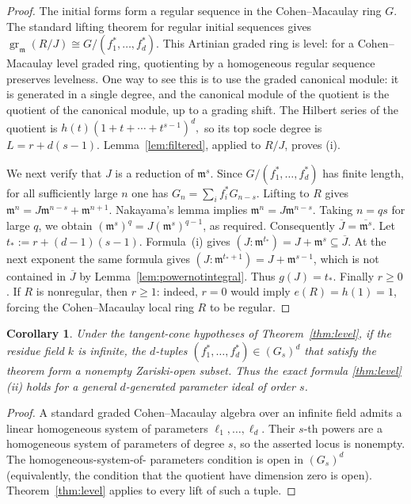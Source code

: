 \documentclass[11pt,a4paper]{amsart}
\numberwithin{equation}{section}
\newtheorem{corollary}[theorem]{Corollary}
\newcommand{\m}{\mathfrak m}
\newcommand{\ol}[1]{\overline{#1}}
\newcommand{\gr}{\operatorname{gr}}
\begin{document}
 \begin{proof}
 	The initial forms form a regular sequence in the
 	Cohen--Macaulay ring $G$.  The standard lifting theorem for
 	regular initial sequences gives
 	$ \gr_\m(R/J)\cong G/(f_1^*,\ldots,f_d^*). $
 	This Artinian graded ring is level: for a Cohen--Macaulay
 	level graded ring, quotienting by a homogeneous regular
 	sequence preserves levelness.  One way to see this is to
 	use the graded canonical module: it is generated in a single
 	degree, and the canonical module of the quotient is the
 	quotient of the canonical module, up to a grading shift.
 	The Hilbert series of the quotient is
 	$ 	h(t)(1+t+\cdots+t^{s-1})^d, $
 	so its top socle degree is $L=r+d(s-1)$.
 	Lemma~\ref{lem:filtered}, applied to $R/J$, proves
 	(i).
 	
 	We next verify that $J$ is a reduction of $\m^s$.
 	Since $G/(f_1^*,\ldots,f_d^*)$ has finite length,
 	for all sufficiently large $n$ one has
 	$G_n=\sum_i f_i^*G_{n-s}$.  Lifting to $R$ gives
 	$ \m^n=J\m^{n-s}+\m^{n+1}. $
 	Nakayama's lemma implies $\m^n=J\m^{n-s}$.
 	Taking $n=qs$ for large $q$, we obtain
 	$(\m^s)^q=J(\m^s)^{q-1}$, as required.
 	Consequently $\ol J=\ol{\m^s}$.
 	Let  $t_*:=r+(d-1)(s-1)$.  Formula~(i)
 	gives $(J:\m^{t_*})=J+\m^s\subseteq\ol J$.
 	At the next exponent the same formula gives
 	$(J:\m^{t_*+1})=J+\m^{s-1}$, which is not contained
 	in $\ol J$ by Lemma~\ref{lem:powernotintegral}.
 	Thus $g(J)=t_*$.
 	Finally $r\geq0$.  If $R$ is nonregular, then $r\geq1$:
 	indeed, $r=0$ would imply $e(R)=h(1)=1$, forcing the
 	Cohen--Macaulay local ring $R$ to be regular.
 \end{proof}
 
 \begin{corollary}
 	\label{cor:generic}
 	Under the tangent-cone hypotheses of Theorem~\ref{thm:level},
 	if the residue field $k$ is infinite, the $d$-tuples
 	$(f_1^*,\ldots,f_d^*)\in(G_s)^d$ that satisfy the theorem
 	form a nonempty Zariski-open subset.  Thus the exact formula
 	\ref{thm:level}(ii) holds for a general $d$-generated
 	parameter ideal of order $s$.
 \end{corollary}
 \begin{proof}
 	A standard graded Cohen--Macaulay algebra over an infinite
 	field admits a linear homogeneous system of parameters
 	$\ell_1,\ldots,\ell_d$.  Their $s$-th powers are a
 	homogeneous system of parameters of degree $s$, so the
 	asserted locus is nonempty.  The homogeneous-system-of-
 	parameters condition is open in $(G_s)^d$ (equivalently,
 	the condition that the quotient have dimension zero is open).
 	Theorem~\ref{thm:level} applies to every lift of such a tuple.
 \end{proof}
 
\end{document}
